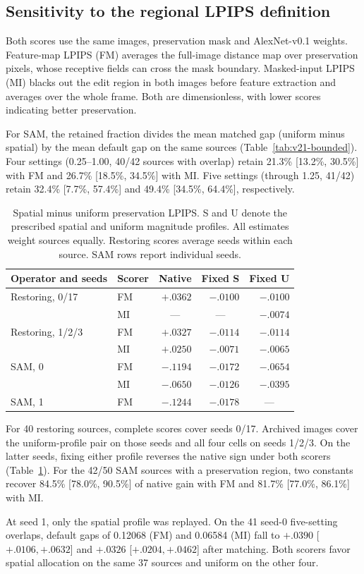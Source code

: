 \subsection{Sensitivity to the regional LPIPS definition}
\label{sec:v19_metric}
Both scores use the same images, preservation mask and AlexNet-v0.1 weights. Feature-map LPIPS (FM) averages the full-image distance map over preservation pixels, whose receptive fields can cross the mask boundary. Masked-input LPIPS (MI) blacks out the edit region in both images before feature extraction and averages over the whole frame. Both are dimensionless, with lower scores indicating better preservation.

For SAM, the retained fraction divides the mean matched gap (uniform minus spatial) by the mean default gap on the same sources (Table~\ref{tab:v21-bounded}). Four settings (0.25--1.00, 40/42 sources with overlap) retain 21.3\% [13.2\%, 30.5\%] with FM and 26.7\% [18.5\%, 34.5\%] with MI. Five settings (through 1.25, 41/42) retain 32.4\% [7.7\%, 57.4\%] and 49.4\% [34.5\%, 64.4\%], respectively.

\begin{table}[t]
\centering\small
\caption{Spatial minus uniform preservation LPIPS. S and U denote the prescribed spatial and uniform magnitude profiles. All estimates weight sources equally. Restoring scores average seeds within each source. SAM rows report individual seeds.}
\label{tab:v19_metric}
\begin{tabular}{llrrr}
\hline
Operator and seeds & Scorer & Native & Fixed S & Fixed U\\
\hline
Restoring, 0/17  & FM & $+.0362$ & $-.0100$ & $-.0100$\\
                 & MI      & \multicolumn{1}{c}{---} & \multicolumn{1}{c}{---} & $-.0074$\\
Restoring, 1/2/3 & FM & $+.0327$ & $-.0114$ & $-.0114$\\
                 & MI      & $+.0250$ & $-.0071$ & $-.0065$\\
SAM, 0           & FM & $-.1194$ & $-.0172$ & $-.0654$\\
                 & MI      & $-.0650$ & $-.0126$ & $-.0395$\\
SAM, 1           & FM & $-.1244$ & $-.0178$ & \multicolumn{1}{c}{---}\\
\hline
\end{tabular}
\end{table}

For 40 restoring sources, complete scores cover seeds 0/17. Archived images cover the uniform-profile pair on those seeds and all four cells on seeds 1/2/3. On the latter seeds, fixing either profile reverses the native sign under both scorers (Table~\ref{tab:v19_metric}). For the 42/50 SAM sources with a preservation region, two constants recover 84.5\% [78.0\%, 90.5\%] of native gain with FM and 81.7\% [77.0\%, 86.1\%] with MI.

At seed 1, only the spatial profile was replayed. On the 41 seed-0 five-setting overlaps, default gaps of 0.12068 (FM) and 0.06584 (MI) fall to $+.0390$ [$+.0106,+.0632$] and $+.0326$ [$+.0204,+.0462$] after matching. Both scorers favor spatial allocation on the same 37 sources and uniform on the other four.
